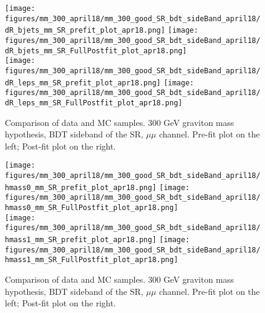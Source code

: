 \begin{figure}[H]
  \begin{center}
    \texttt{[image: figures/mm\_300\_april18/mm\_300\_good\_SR\_bdt\_sideBand\_april18/dR\_bjets\_mm\_SR\_prefit\_plot\_apr18.png]}
    \texttt{[image: figures/mm\_300\_april18/mm\_300\_good\_SR\_bdt\_sideBand\_april18/dR\_bjets\_mm\_SR\_FullPostfit\_plot\_apr18.png]}\\
    \texttt{[image: figures/mm\_300\_april18/mm\_300\_good\_SR\_bdt\_sideBand\_april18/dR\_leps\_mm\_SR\_prefit\_plot\_apr18.png]}
    \texttt{[image: figures/mm\_300\_april18/mm\_300\_good\_SR\_bdt\_sideBand\_april18/dR\_leps\_mm\_SR\_FullPostfit\_plot\_apr18.png]}\\
\caption[Data-MC comparison in the BDT sideband of the SR.]{Comparison of data and MC samples. 300 GeV graviton mass hypothesis, BDT sideband of the SR, $\mu\mu$ channel. Pre-fit plot on the left; Post-fit plot on the right.}
    \label{MCcomparisons_mm_low_SR_bdt_sideband_1}
  \end{center}
\end{figure}


\begin{figure}[H]
  \begin{center}
    \texttt{[image: figures/mm\_300\_april18/mm\_300\_good\_SR\_bdt\_sideBand\_april18/hmass0\_mm\_SR\_prefit\_plot\_apr18.png]}
    \texttt{[image: figures/mm\_300\_april18/mm\_300\_good\_SR\_bdt\_sideBand\_april18/hmass0\_mm\_SR\_FullPostfit\_plot\_apr18.png]}\\
    \texttt{[image: figures/mm\_300\_april18/mm\_300\_good\_SR\_bdt\_sideBand\_april18/hmass1\_mm\_SR\_prefit\_plot\_apr18.png]}
    \texttt{[image: figures/mm\_300\_april18/mm\_300\_good\_SR\_bdt\_sideBand\_april18/hmass1\_mm\_SR\_FullPostfit\_plot\_apr18.png]}\\
\caption[Data-MC comparison in the BDT sideband of the SR.]{Comparison of data and MC samples. 300 GeV graviton mass hypothesis, BDT sideband of the SR, $\mu\mu$ channel. Pre-fit plot on the left; Post-fit plot on the right.}
    \label{MCcomparisons_mm_low_SR_bdt_sideband_2}
  \end{center}
\end{figure}

